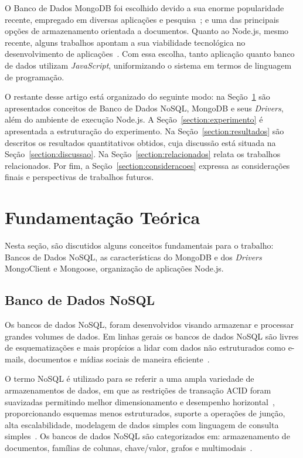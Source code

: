 \documentclass[12pt]{article}
\begin{document}
O Banco de Dados MongoDB foi escolhido devido a sua enorme popularidade recente, empregado em diversas aplicações e pesquisa~\cite{patil:2017,jung:2015,ongo:2018,kanade2014study}; e uma das principais opções de armazenamento orientada a documentos. Quanto ao Node.js, mesmo recente, alguns trabalhos apontam a sua viabilidade tecnológica no desenvolvimento de aplicações~\cite{chaniotis2015node}. Com essa escolha, tanto aplicação quanto banco de dados utilizam \textit{JavaScript}, uniformizando o sistema em termos de linguagem de programação.

O restante desse artigo está organizado do seguinte modo: na Seção~\ref{section:fundamentacao} são apresentados conceitos de Banco de Dados NoSQL, MongoDB e seus \emph{Drivers}, além do ambiente de execução Node.js. 
A Seção~\ref{section:experimento} é apresentada a estruturação do experimento. 
Na Seção~\ref{section:resultados} são descritos os resultados quantitativos obtidos, cuja discussão está situada na Seção~\ref{section:discussao}. Na Seção~\ref{section:relacionados} relata os trabalhos relacionados. Por fim, a Seção~\ref{section:consideracoes} expressa as considerações finais e perspectivas de trabalhos futuros.

\section{Fundamentação Teórica}
\label{section:fundamentacao}

Nesta seção, são discutidos alguns conceitos fundamentais para o trabalho: Bancos de Dados NoSQL, as características do MongoDB e dos \emph{Drivers} MongoClient e Mongoose, organização de aplicações Node.js. 

\subsection{Banco de Dados NoSQL}
\label{subsection:nao-relacional}

Os bancos de dados NoSQL, foram desenvolvidos visando armazenar e processar grandes volumes de dados. Em linhas gerais os bancos de dados NoSQL são livres de esquematizações e mais propícios a lidar com dados não estruturados como e-mails, documentos e mídias sociais de maneira eficiente~\cite{mohamed:2014,ramesh:2016}.

O termo NoSQL é utilizado para se referir a uma ampla variedade de armazenamentos de dados, em que as restrições de transação ACID foram suavizadas permitindo melhor dimensionamento e desempenho horizontal~\cite{rafique:2018}, proporcionando esquemas menos estruturados, suporte a operações de junção, alta escalabilidade, modelagem de dados simples com linguagem de consulta simples~\cite{ramesh:2016}. Os bancos de dados NoSQL são categorizados em: armazenamento de documentos, famílias de colunas, chave/valor, grafos e multimodais~\cite{aparicio:2016}.
\end{document}
